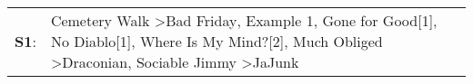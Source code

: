 \begin{supertabular}{p{0.03\textwidth}p{0.92\textwidth}}
 \textbf{S1}:  &  Cemetery Walk\textsuperscript{} \textgreater \enspace Bad Friday\textsuperscript{}, \enspace Example 1\textsuperscript{}, \enspace Gone for Good[1]\textsuperscript{}, \enspace No Diablo[1]\textsuperscript{}, \enspace Where Is My Mind?[2]\textsuperscript{}, \enspace Much Obliged\textsuperscript{} \textgreater \enspace Draconian\textsuperscript{}, \enspace Sociable Jimmy\textsuperscript{} \textgreater \enspace JaJunk\textsuperscript{}  \enspace  \\
\end{supertabular}
